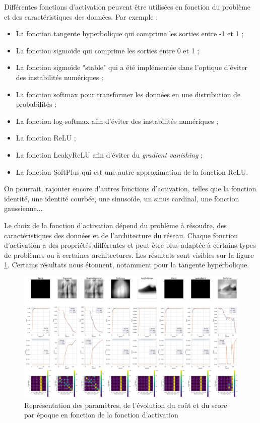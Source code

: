 \documentclass{article}
\begin{document}
Différentes fonctions d'activation peuvent être utilisées en fonction du problème et des caractéristiques des données. Par exemple :

\begin{itemize}
    \item La fonction tangente hyperbolique qui comprime les sorties entre -1 et 1 ;
    \item La fonction sigmoïde qui comprime les sorties entre 0 et 1 ;
    \item La fonction sigmoïde "stable" qui a été implémentée dans l'optique d'éviter des instabilités numériques ;
    \item La fonction softmax pour transformer les données en une distribution de probabilités ;
    \item La fonction log-softmax afin d'éviter des instabilités numériques ;
    \item La fonction ReLU ;
    \item La fonction LeakyReLU afin d'éviter du \textit{gradient vanishing} ;
    \item La fonction SoftPlus qui est une autre approximation de la fonction ReLU.
\end{itemize}

On pourrait, rajouter encore d'autres fonctions d'activation, telles que la fonction identité, une identité courbée, une sinusoïde, un sinus cardinal, une fonction gaussienne...

Le choix de la fonction d'activation dépend du problème à résoudre, des caractéristiques des données et de l'architecture du réseau. Chaque fonction d'activation a des propriétés différentes et peut être plus adaptée à certains types de problèmes ou à certaines architectures. Les résultats sont visibles sur la figure \ref{fig:activationfunc}. Certains résultats nous étonnent, notamment pour la tangente hyperbolique. 

\begin{figure}[htbp]
    \centering
    \includegraphics[width=\textwidth]{activation_func.pdf}
    \caption{Représentation des paramètres, de l'évolution du coût et du score par époque en fonction de la fonction d'activation}
    \label{fig:activationfunc}
\end{figure}
\end{document}
